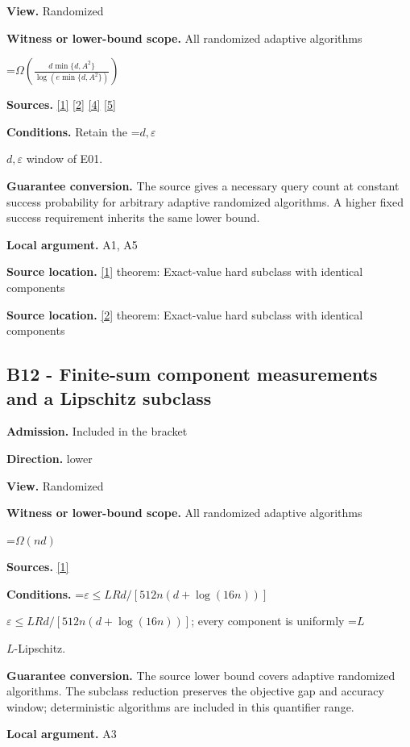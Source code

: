 \documentclass[10pt,a4paper]{article}
\newcommand{\AtlasMath}[1]{\par\begingroup\centering\setbox0=\hbox{$\displaystyle #1$}\ifdim\wd0>1.4\linewidth\typeout{ATLAS WIDE FORMULA: \the\wd0}\fi\ifdim\wd0>\linewidth\resizebox{\linewidth}{!}{\box0}\else\box0\fi\par\endgroup}
\newcommand{\AtlasInlineMath}[1]{\begingroup\setbox0=\hbox{$#1$}\ifdim\wd0>.4\linewidth\endgroup\AtlasMath{#1}\else\endgroup$#1$\fi}
\begin{document}
\textbf{View.} Randomized

\textbf{Witness or lower-bound scope.} All randomized adaptive algorithms

\AtlasMath{\Omega\!\left(\frac{d\min\{d,A^2\}}{\log(e\min\{d,A^2\})}\right)}
\textbf{Sources.} \href{https://arxiv.org/html/2610.00345v1}{[1]} \href{https://arxiv.org/html/2607.16558v2}{[2]} \href{https://www.mathnet.ru/php/archive.phtml?jrnid=mzm&option_lang=eng&paperid=1697&wshow=paper}{[4]} \href{https://arxiv.org/abs/2109.08858}{[5]}

\textbf{Conditions.} Retain the \AtlasInlineMath{d,\varepsilon} window of E01.

\textbf{Guarantee conversion.} The source gives a necessary query count at constant success probability for arbitrary adaptive randomized algorithms. A higher fixed success requirement inherits the same lower bound.

\textbf{Local argument.} A1, A5

\textbf{Source location.} \href{https://arxiv.org/html/2610.00345v1}{[1]} theorem: Exact-value hard subclass with identical components

\textbf{Source location.} \href{https://arxiv.org/html/2607.16558v2}{[2]} theorem: Exact-value hard subclass with identical components

\subsection{B12 - Finite-sum component measurements and a Lipschitz subclass}
\textbf{Admission.} Included in the bracket

\textbf{Direction.} lower

\textbf{View.} Randomized

\textbf{Witness or lower-bound scope.} All randomized adaptive algorithms

\AtlasMath{\Omega(nd)}
\textbf{Sources.} \href{https://arxiv.org/html/2610.00345v1}{[1]}

\textbf{Conditions.} \AtlasInlineMath{\varepsilon\le LRd/[512n(d+\log(16n))]}; every component is uniformly \AtlasInlineMath{L}-Lipschitz.

\textbf{Guarantee conversion.} The source lower bound covers adaptive randomized algorithms. The subclass reduction preserves the objective gap and accuracy window; deterministic algorithms are included in this quantifier range.

\textbf{Local argument.} A3
\end{document}
